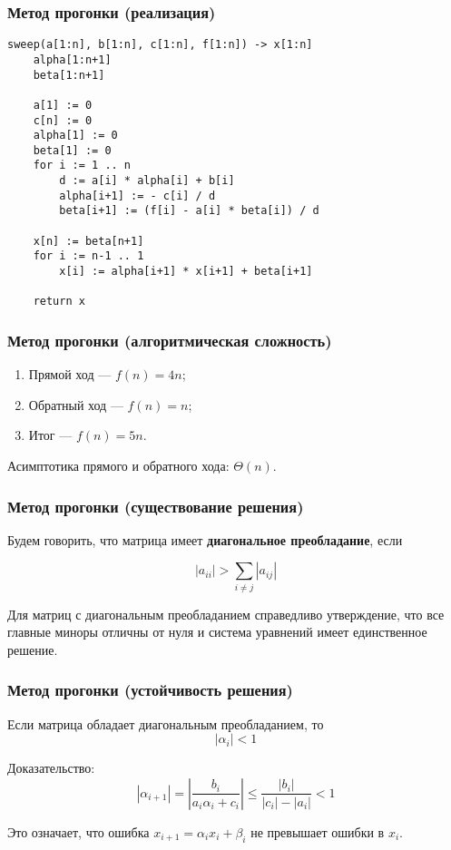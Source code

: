\documentclass[10pt]{beamer}
\begin{document}
\begin{frame}[fragile]
\frametitle{Метод прогонки (реализация)}
\begin{lstlisting}
sweep(a[1:n], b[1:n], c[1:n], f[1:n]) -> x[1:n]
	alpha[1:n+1]
	beta[1:n+1]

	a[1] := 0
	c[n] := 0
	alpha[1] := 0
	beta[1] := 0
	for i := 1 .. n
    	d := a[i] * alpha[i] + b[i]
    	alpha[i+1] := - c[i] / d
    	beta[i+1] := (f[i] - a[i] * beta[i]) / d

	x[n] := beta[n+1]
	for i := n-1 .. 1
    	x[i] := alpha[i+1] * x[i+1] + beta[i+1]

    return x
\end{lstlisting}
\end{frame}

\begin{frame}[fragile]
\frametitle{Метод прогонки (алгоритмическая сложность)}

\begin{enumerate}
\item Прямой ход --- $f(n) = 4n$;
\item Обратный ход --- $f(n) = n$;
\item Итог --- $f(n) = 5n$.
\end{enumerate}

Асимптотика прямого и обратного хода: $\Theta(n)$.

\end{frame}

\begin{frame}[fragile]
\frametitle{Метод прогонки (существование решения)}
Будем говорить, что матрица имеет \textbf{диагональное преобладание}, если

$$ |a_{ii}| > \sum_{i\neq j}|a_{ij}|$$

Для матриц с диагональным преобладанием справедливо утверждение, что все главные миноры отличны от нуля и система уравнений имеет единственное решение.
\end{frame}

\begin{frame}[fragile]
\frametitle{Метод прогонки (устойчивость решения)}
Если матрица обладает диагональным преобладанием, то
$$ |\alpha_{i}| < 1$$

Доказательство:
$$|\alpha_{i+1}| = \left|\frac{b_i}{a_i \alpha_i + c_i}\right| \leqslant \frac{|b_i|}{|c_i| - |a_i|} < 1 $$

Это означает, что ошибка $x_{i+1} = \alpha_i x_i + \beta_i$ не превышает ошибки в $x_i$.
\end{frame}
\end{document}
